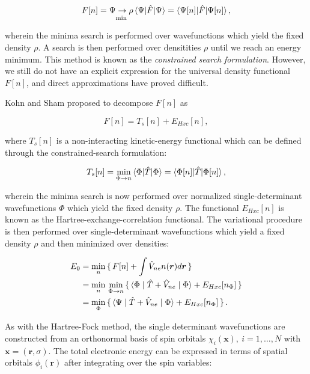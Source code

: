 $$ F[n] = \underset{\min}{\Psi \rightarrow \rho}
    \braket{\Psi | \hat{F} | \Psi}
    = \braket{\Psi[n] | \hat{F} | \Psi[n]} , $$

wherein the minima search is performed over wavefunctions
which yield the fixed density $\rho$.
A search is then performed over densitities $\rho$
until we reach an energy minimum. This method
is known as the \textit{constrained search formulation}.
However, we still do not have an explicit expression
for the universal density functional $F[n]$, and
direct approximations have proved difficult.
\par
Kohn and Sham proposed to decompose $F[n]$ as

$$ F[n] = T_s[n] + E_{Hxc}[n] , $$

where $T_s[n]$ is a non-interacting kinetic-energy functional
which can be defined through the constrained-search formulation:

$$ T_s[n] = \underset{\Phi \rightarrow n}{\min}
    \braket{\Phi | \hat{T} | \Phi}
    = \braket{\Phi[n] | \hat{T} | \Phi[n]} , $$

wherein the minima search is now performed over normalized
single-determinant wavefunctions $\Phi$ which yield
the fixed density $\rho$. The functional
$E_{Hxc}[n]$ is known as the Hartree-exchange-correlation
functional. The variational procedure is then
performed over single-determinant wavefunctions
which yield a fixed density $\rho$ and then
minimized over densities:

\begin{equation}
    \begin{split}
        E_0
        &= \underset{n}{\min} \set{
            F[n] + \int \hat{V}_{ne} n(\bm{r}) d\bm{r} } \\
        &= \underset{n}{\min} \
            \underset{\Phi \rightarrow n}{\min} \set{
            \braket{\Phi | \hat{T} + \hat{V}_{ne} | \Phi}
            + E_{Hxc}[n_{\Phi}]} \\
        &=  \underset{\Phi}{\min}
            \set{ \braket{\Psi|\hat{T} + \hat{V}_{ne}|\Phi}
            + E_{Hxc}[n_{\Phi}]} .
    \end{split}
\end{equation}

As with the Hartree-Fock method, the single determinant
wavefunctions are constructed from an orthonormal basis of spin orbitals
$\chi_i (\bm{x}), \ i=1,\dots,N$ with $\bm{x} = (\bm{r}, \sigma)$.
The total electronic energy can be expressed in terms of spatial
orbitals $\phi_i(\bm{r})$ after integrating over the spin variables:

